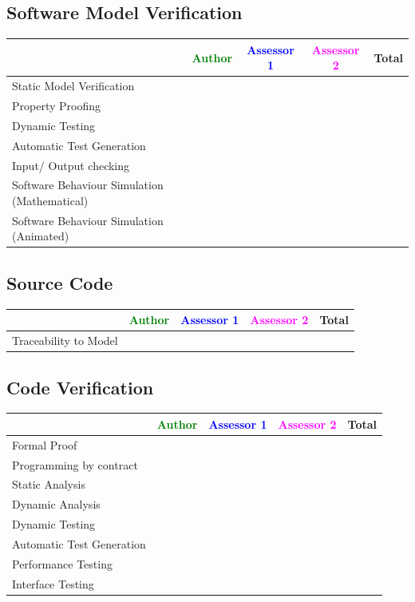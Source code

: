 \subsection{Software Model Verification	}


\begin{tabular}{|l | c | c | c | c|}
\hline
& \textcolor{green}{Author} & \textcolor{blue}{Assessor 1} & \textcolor{magenta}{Assessor 2} & Total \\
\hline 
Static Model Verification & & & &  \\
\hline
Property Proofing & & & &  \\
\hline
Dynamic Testing & & & &  \\
\hline
Automatic Test Generation & & & &  \\
\hline
Input/ Output checking & & & &  \\
\hline
Software Behaviour Simulation (Mathematical) & & & &  \\
\hline
Software Behaviour Simulation (Animated) & & & &  \\
\hline
\end{tabular}


\subsection{Source Code}


\begin{tabular}{|l | c | c | c | c|}
\hline
& \textcolor{green}{Author} & \textcolor{blue}{Assessor 1} & \textcolor{magenta}{Assessor 2} & Total \\
\hline 
Traceability to Model & & & &  \\
\hline
\end{tabular}


\subsection{Code Verification	}


\begin{tabular}{|l | c | c | c | c|}
\hline
& \textcolor{green}{Author} & \textcolor{blue}{Assessor 1} & \textcolor{magenta}{Assessor 2} & Total \\
\hline 
Formal Proof & & & &  \\
\hline
Programming by contract & & & &  \\
\hline
Static Analysis & & & &  \\
\hline
Dynamic Analysis & & & &  \\
\hline
Dynamic Testing & & & &  \\
\hline
Automatic Test Generation & & & &  \\
\hline
Performance Testing & & & &  \\
\hline
Interface Testing & & & &  \\
\hline
\end{tabular}

